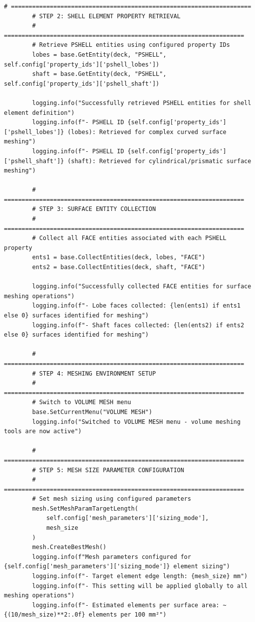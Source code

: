 \documentclass{book}
\begin{document}
\begin{itemize}[leftmargin=*,label=\textbullet]
\begin{itemize}
\begin{lstlisting}[caption={Phase 1 Meshing Automation Script},label={lst:phase1}]
        # ====================================================================
        # STEP 2: SHELL ELEMENT PROPERTY RETRIEVAL
        # ====================================================================
        # Retrieve PSHELL entities using configured property IDs
        lobes = base.GetEntity(deck, "PSHELL", self.config['property_ids']['pshell_lobes'])
        shaft = base.GetEntity(deck, "PSHELL", self.config['property_ids']['pshell_shaft'])
        
        logging.info("Successfully retrieved PSHELL entities for shell element definition")
        logging.info(f"- PSHELL ID {self.config['property_ids']['pshell_lobes']} (lobes): Retrieved for complex curved surface meshing")
        logging.info(f"- PSHELL ID {self.config['property_ids']['pshell_shaft']} (shaft): Retrieved for cylindrical/prismatic surface meshing")
        
        # ====================================================================
        # STEP 3: SURFACE ENTITY COLLECTION
        # ====================================================================
        # Collect all FACE entities associated with each PSHELL property
        ents1 = base.CollectEntities(deck, lobes, "FACE")
        ents2 = base.CollectEntities(deck, shaft, "FACE")
        
        logging.info("Successfully collected FACE entities for surface meshing operations")
        logging.info(f"- Lobe faces collected: {len(ents1) if ents1 else 0} surfaces identified for meshing")
        logging.info(f"- Shaft faces collected: {len(ents2) if ents2 else 0} surfaces identified for meshing")
        
        # ====================================================================
        # STEP 4: MESHING ENVIRONMENT SETUP
        # ====================================================================
        # Switch to VOLUME MESH menu
        base.SetCurrentMenu("VOLUME MESH")
        logging.info("Switched to VOLUME MESH menu - volume meshing tools are now active")
        
        # ====================================================================
        # STEP 5: MESH SIZE PARAMETER CONFIGURATION
        # ====================================================================
        # Set mesh sizing using configured parameters
        mesh.SetMeshParamTargetLength(
            self.config['mesh_parameters']['sizing_mode'], 
            mesh_size
        )
        mesh.CreateBestMesh()
        logging.info(f"Mesh parameters configured for {self.config['mesh_parameters']['sizing_mode']} element sizing")
        logging.info(f"- Target element edge length: {mesh_size} mm")
        logging.info(f"- This setting will be applied globally to all meshing operations")
        logging.info(f"- Estimated elements per surface area: ~{(10/mesh_size)**2:.0f} elements per 100 mm²")
        

\end{lstlisting}
\end{itemize}
\end{itemize}
\end{document}
